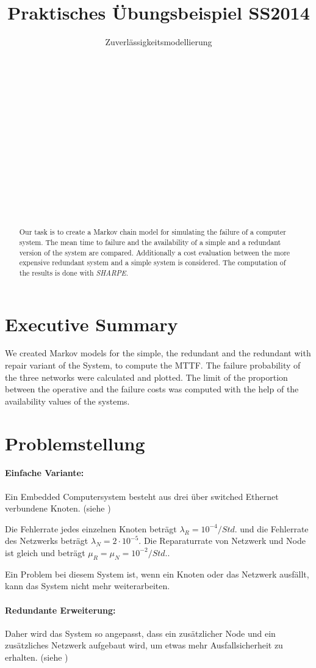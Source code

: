 \documentclass[
            a4paper
            ]{scrartcl}%
\title{Praktisches Übungsbeispiel SS2014}
\subtitle{Zuverlässigkeitsmodellierung}
\author{
 \authorname{Markus Kessler} \\
 \studentnumber{1225380} \\
 \curriculum{033 535}\\
 \email{e1225380@student.tuwien.ac.at}\\\\
 \authorname{Mathias Lechner} \\
 \studentnumber{1225134} \\
 \curriculum{033 535}\\
 \email{e1225134@student.tuwien.ac.at}\\\\
 \authorname{Martin Wührer} \\
 \studentnumber{1225177} \\
 \curriculum{033 535}\\
 \email{e1225177@student.tuwien.ac.at}
}
\begin{document}
\renewcommand*{\Frefeqname}{Gleichung}
\renewcommand*{\Freffigname}{Abbildung}
\renewcommand*{\Frefsecname}{Abschnitt}

\maketitle
\newpage

\tableofcontents
\newpage
\begin{abstract}
Our task is to create a Markov chain model for simulating the failure of a
computer system. The mean time to failure and the availability of a simple and a
redundant version of the system are compared. Additionally a cost evaluation
between the more expensive redundant system and a simple system is considered.
The computation of the results is done with \emph{SHARPE}.
\end{abstract}

\section{Executive Summary}
We created Markov models for the simple, the redundant and the redundant with repair variant of the System, to compute the MTTF. The failure probability of the three networks were calculated and plotted. The limit of the proportion between the operative and the failure costs was computed with the help of the availability values of the systems. 
\newpage

\section{Problemstellung}
\paragraph{Einfache Variante:}
Ein Embedded Computersystem besteht aus drei über switched Ethernet verbundene
Knoten. (siehe )

Die Fehlerrate jedes einzelnen Knoten beträgt $\lambda_R=10^{-4}/Std.$ und die Fehlerrate
des Netzwerks beträgt $\lambda_N=2\cdot 10^{-5}$.
Die Reparaturrate von Netzwerk und Node ist gleich und beträgt
$\mu_R=\mu_N=10^{-2}/Std.$.

Ein Problem bei diesem System ist, wenn ein Knoten oder das Netzwerk ausfällt, kann das System nicht mehr
weiterarbeiten.

\paragraph{Redundante Erweiterung:}
Daher wird das System so angepasst, dass ein zusätzlicher Node und ein
zusätzliches Netzwerk aufgebaut wird, um etwas mehr Ausfallsicherheit zu
erhalten. (siehe )
\end{document}
